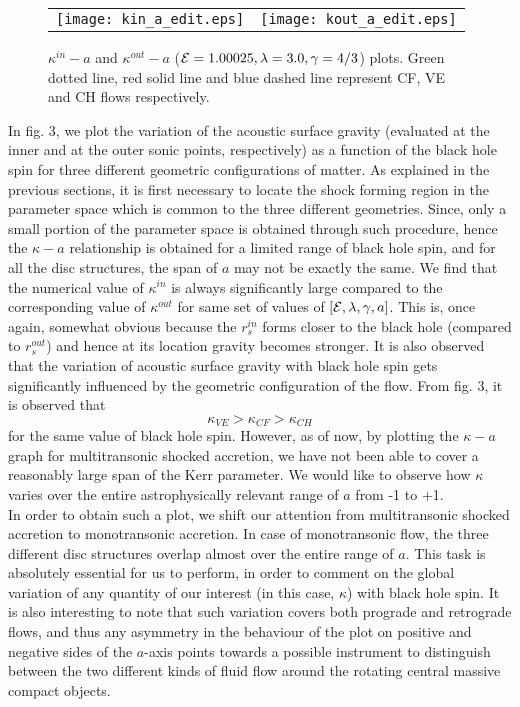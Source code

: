 \documentclass[10pt,authoryear]{article}
\begin{document}
\begin{figure}[h!]
\centering
\begin{tabular}{cc}
\texttt{[image: kin\_a\_edit.eps]} &
\texttt{[image: kout\_a\_edit.eps]}
\end{tabular}
\caption{$\kappa^{in} - a$ and $\kappa^{out} - a$ (${\cal E}=1.00025,\lambda=3.0,\gamma=4/3$) plots. 
Green dotted line, red solid line and blue dashed line represent CF, VE and CH flows respectively.}
\label{fig3}
\end{figure}

In fig. 3, we plot the variation of the acoustic surface gravity (evaluated at the inner and at the outer sonic points, respectively) 
as a function of the black hole spin for three different geometric configurations of matter. As explained in the previous sections, 
it is first necessary to locate the shock forming region in the parameter space which is common to the three different geometries. 
Since, only a small portion of the parameter space is obtained through such procedure, hence the $\kappa - a$ relationship is obtained 
for a limited range of black hole spin, and for all the disc structures, the span of $a$ may not be exactly the same. 
We find that the numerical value of $\kappa^{in}$ is always significantly large compared to the corresponding value of $\kappa^{out}$ for same set of 
values of $\left[{\cal E},\lambda,\gamma,a\right]$. This is, 
once again, somewhat obvious because the $r_s^{in}$ forms closer to the black hole (compared to $r_s^{out}$) and hence at its location gravity becomes 
stronger. It is also observed that the variation of acoustic surface gravity with black hole spin gets significantly influenced by the geometric 
configuration of the flow. From fig. 3, it is observed that \\
\begin{equation}
\kappa_{VE}>\kappa_{CF}>\kappa_{CH}
\label{eqn4}
\end{equation}
for the same value of black hole spin. However, as of now, by plotting the $\kappa - a$ graph for 
multitransonic shocked accretion, we have not been able to cover a reasonably large span of the Kerr parameter. We would like to observe how $\kappa$ varies over the entire astrophysically relevant range of $a$ from -1 to +1. \\
In order to obtain such a plot, we shift our attention from multitransonic shocked accretion to monotransonic accretion. In case of 
monotransonic flow, the three different disc structures overlap almost over the entire range of $a$. This task is absolutely 
essential for us to perform, in order to comment on the global variation of any quantity of our interest (in this case, $\kappa$) with black hole spin. 
It is also interesting to note that such variation covers both prograde and retrograde flows, and thus any asymmetry in the behaviour of the plot 
on positive and negative sides of the $a$-axis points towards a possible instrument to distinguish between the two different kinds of fluid flow 
around the rotating central massive compact objects. 
\end{document}
